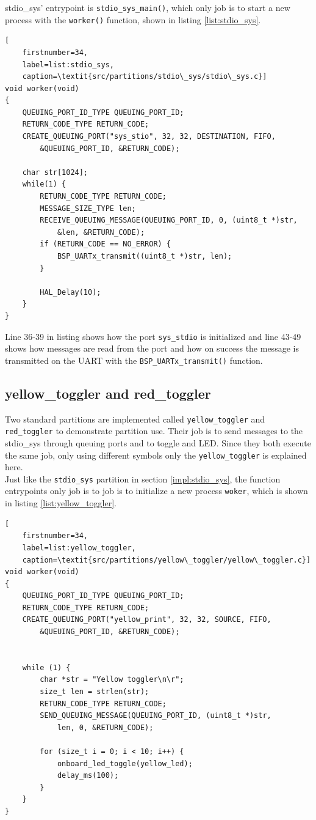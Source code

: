stdio\_sys' entrypoint is \texttt{stdio\_sys\_main()}, which only job is to
start a new process with the \texttt{worker()} function, shown in listing
\ref{list:stdio_sys}.

\begin{minipage}{\linewidth}
\begin{lstlisting}[
	firstnumber=34,
	label=list:stdio_sys,
	caption=\textit{src/partitions/stdio\_sys/stdio\_sys.c}]
void worker(void)
{
    QUEUING_PORT_ID_TYPE QUEUING_PORT_ID;
    RETURN_CODE_TYPE RETURN_CODE;
    CREATE_QUEUING_PORT("sys_stio", 32, 32, DESTINATION, FIFO,
		&QUEUING_PORT_ID, &RETURN_CODE);

    char str[1024];
    while(1) {
        RETURN_CODE_TYPE RETURN_CODE;
        MESSAGE_SIZE_TYPE len;
        RECEIVE_QUEUING_MESSAGE(QUEUING_PORT_ID, 0, (uint8_t *)str,
			&len, &RETURN_CODE);
        if (RETURN_CODE == NO_ERROR) {
            BSP_UARTx_transmit((uint8_t *)str, len);
        }

        HAL_Delay(10);
    }
}
\end{lstlisting}
\end{minipage}

Line 36-39 in listing shows how the port \texttt{sys\_stdio} is initialized and line
43-49 shows how messages are read from the port and how on success the message
is transmitted on the UART with the \texttt{BSP\_UARTx\_transmit()} function.


\subsection{yellow\_toggler and red\_toggler}
Two standard partitions are implemented called \texttt{yellow\_toggler} and
\texttt{red\_toggler} to demonstrate partition use. Their job is to send
messages to the stdio\_sys through queuing ports and to toggle and LED. Since they
both execute the same job, only using different symbols only the
\texttt{yellow\_toggler} is explained here.\\

Just like the \texttt{stdio\_sys} partition in section \ref{impl:stdio_sys}, the
function entrypoints only job is to job is to initialize a new process
\texttt{woker}, which is shown in listing \ref{list:yellow_toggler}.

\begin{minipage}{\linewidth}
\begin{lstlisting}[
	firstnumber=34,
	label=list:yellow_toggler,
	caption=\textit{src/partitions/yellow\_toggler/yellow\_toggler.c}]
void worker(void)
{
    QUEUING_PORT_ID_TYPE QUEUING_PORT_ID;
    RETURN_CODE_TYPE RETURN_CODE;
    CREATE_QUEUING_PORT("yellow_print", 32, 32, SOURCE, FIFO,
		&QUEUING_PORT_ID, &RETURN_CODE);


    while (1) {
        char *str = "Yellow toggler\n\r";
        size_t len = strlen(str);
        RETURN_CODE_TYPE RETURN_CODE;
        SEND_QUEUING_MESSAGE(QUEUING_PORT_ID, (uint8_t *)str,
			len, 0,	&RETURN_CODE);

        for (size_t i = 0; i < 10; i++) {
            onboard_led_toggle(yellow_led);
            delay_ms(100);
        }
    }
}
\end{lstlisting}
\end{minipage}

